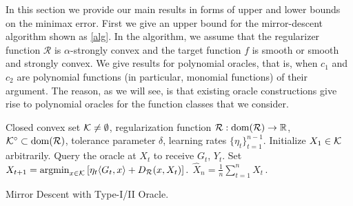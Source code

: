 
In this section we provide our main results in forms of upper and lower bounds on the minimax error.
First we give an upper bound for the mirror-descent algorithm shown as \cref{alg}.
In the algorithm, we assume that the regularizer function $\mathcal{R}$ is $\alpha$-strongly convex and the target function $f$ is smooth or  smooth and strongly convex.
We give results for polynomial oracles, that is, when $c_1$ and $c_2$ are polynomial functions (in particular, monomial functions)
of their argument. The reason, as we will see, is that existing oracle constructions give rise to polynomial oracles for the function classes that we consider.

%

\begin{algorithm}[t]
\begin{algorithmic}
      Closed convex set $\mathcal{K}\ne \emptyset$, regularization function $\mathcal{R}:\operatorname{dom}(\mathcal{R})\to \mathbb{R}$, $\mathcal{K}^{\circ}\subset \operatorname{dom}(\mathcal{R})$, tolerance parameter $\delta$, learning rates $\{\eta_t\}_{t=1}^{n-1}$.
\State Initialize $X_1\in \mathcal{K}$ arbitrarily.
	\State Query the oracle at $X_t$ to receive $G_t$, $Y_t$.
	\State Set
	$X_{t+1}=\operatorname{argmin}_{x\in \mathcal{K}}\left[ \eta_{t} \langle G_t,x \rangle+D_{\mathcal{R}}(x,X_t) \right].$
\EndFor
{} $\hat{X}_n = \frac{1}{n}\sum_{t=1}^n X_t \,.$
\end{algorithmic}
\caption{Mirror Descent with Type-I/II Oracle.
\label{alg}}
\end{algorithm}


